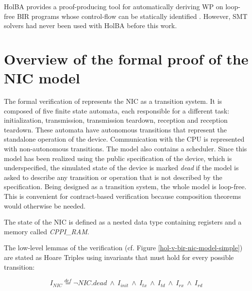 \documentclass[10pt,a4paper]{article}
\newcommand{\eqdef}{\stackrel{def}{=}}
\begin{document}
\begin{multicols}{2}
{HolBA} provides a {proof-producing} tool for automatically deriving WP on loop-free {BIR} programs whose control-flow can be statically identified \cite{lindner_trabin:_2019}. However, SMT solvers had never been used with HolBA before this work.


\section{Overview of the formal proof of the NIC model} \label{overview-nic-proof}

The formal verification of \cite{haglund_formal_2016} represents the NIC as a transition system. It is composed of five finite state automata, each responsible for a different task: initialization, transmission, transmission teardown, reception and reception teardown. These automata have autonomous transitions that represent the standalone operation of the device. Communication with the CPU is represented with non-autonomous transitions. The model also contains a scheduler. Since this model has been realized using the public specification of the device, which is underspecified, the simulated state of the device is marked \textit{dead} if the model is asked to describe any transition or operation that is not described by the specification.
Being designed as a transition system, the whole model is loop-free. This is convenient for contract-based verification because composition theorems would otherwise be needed.

The state of the NIC is defined as a nested data type containing registers and a memory called \textit{CPPI\_RAM}.

The low-level lemmas of the verification (cf. Figure \ref{hol-v-bir-nic-model-simple}) are stated as Hoare Triples using invariants that must hold for every possible transition:
%
\begin{small}
  \begin{equation}
    \label{nic-proof-invariant-shape}
    I_{NIC} \eqdef \neg NIC.dead~\land~I_{init}~\land~I_{tx}~\land~I_{td}~\land~I_{rx}~\land~I_{rd}
  \end{equation}
\end{small}


\end{multicols}
\end{document}

